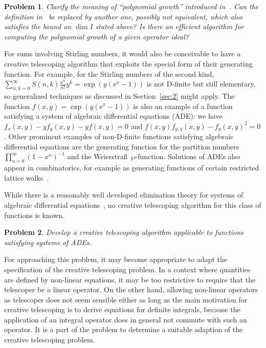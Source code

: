 \documentclass[a4paper,draft]{amsart}
\def\e{\mathrm{e}}
\newtheorem{problem}{Problem}
\begin{document}
 \begin{problem}
   Clarify the meaning of ``polynomial growth'' introduced in~\cite{chyzak09a}.
   Can the definition in~\cite{chyzak09a} be replaced by another one, possibly not equivalent, which also
   satisfies the bound on $\dim I$ stated above?
   Is there an efficient algorithm for computing the polynomial growth of a given operator ideal?
 \end{problem}

 For sums involving Stirling numbers, it would also be conceivable to have a
 creative telescoping algorithm that exploits the special form of their
 generating function. For example, for the Stirling numbers of the second kind,
 $\sum_{n,k=0}^\infty S(n,k)\frac{x^n}{n!} y^k=\exp(y(\e^x-1))$ is not D-finite
 but still elementary, so generalized techniques as discussed in
 Section~\ref{sec:2} might apply. The function $f(x,y)=\exp(y(\e^x-1))$ is also
 an example of a function satisfying a system of algebraic differential equations (ADE):
 we have $f_x(x,y)-y f_y(x,y)-yf(x,y)=0$ and $f(x,y)f_{y,y}(x,y) - f_y(x,y)^2 = 0$.
 Other prominent examples of non-D-finite functions satisfying algebraic differential
 equations are the generating function for the partition numbers $\prod_{n=0}^\infty(1-x^n)^{-1}$
 and the Weierstra\ss\ $\wp$-function. Solutions of ADEs also appear in combinatorics, for
 example as generating functions of certain restricted lattice walks~\cite{bernardi16}.

 While there is a reasonably well developed elimination theory for systems of algebraic
 differential equations~\cite{mansfield93,gerdt97,hubert00,chen03, gao2013}, no creative telescoping algorithm for this class
 of functions is known.

 \begin{problem}
   Develop a creative telescoping algorithm applicable to functions satisfying
   systems of ADEs.
 \end{problem}

 For approaching this problem, it may become appropriate to adapt the
 specification of the creative telescoping problem. In a context where
 quantities are defined by non-linear equations, it may be too restrictive to
 require that the telescoper be a linear operator. On the other hand, allowing
 non-linear operators as telescoper does not seem sensible either as long as the
 main motivation for creative telescoping is to derive equations for definite
 integrals, because the application of an integral operator does in general not
 commute with such an operator. It is a part of the
 problem to determine a suitable adaption of the creative telescoping problem.
\end{document}
